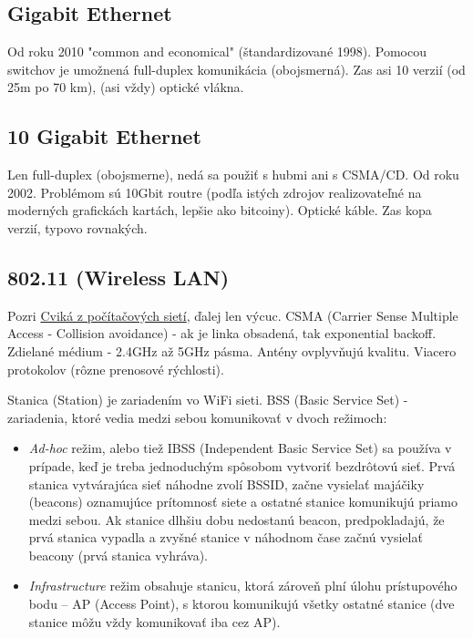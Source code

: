 \documentclass[10pt,a4paper]{article}
\begin{document}
\subsection{Gigabit Ethernet}       
Od roku 2010 "common and economical" (štandardizované 1998). Pomocou switchov je umožnená full-duplex komunikácia (obojsmerná). 
Zas asi 10 verzií (od 25m po 70 km), (asi vždy) optické vlákna. 

\subsection{10 Gigabit Ethernet}  
Len full-duplex (obojsmerne), nedá sa použiť s hubmi ani s CSMA/CD. 
Od roku 2002. Problémom sú 10Gbit routre (podľa istých zdrojov realizovateľné na moderných grafickách kartách, lepšie ako bitcoiny). Optické káble. Zas kopa verzií, typovo rovnakých. 

\subsection{802.11 (Wireless LAN)}  

Pozri \href{http://netlab.dcs.fmph.uniba.sk/siete/cviko2/}{Cviká z počítačových sietí}, ďalej len výcuc. 
CSMA (Carrier Sense Multiple Access - Collision avoidance) - ak je linka obsadená, tak exponential backoff. Zdielané médium - 2.4GHz až 5GHz pásma. 
Antény ovplyvňujú kvalitu. Viacero protokolov (rôzne prenosové rýchlosti).

Stanica (Station) je zariadením vo WiFi sieti. BSS (Basic Service Set) - zariadenia, ktoré vedia medzi sebou komunikovať v dvoch režimoch:
\begin{itemize}
\item \emph{Ad-hoc} režim, alebo tiež IBSS (Independent Basic Service Set) sa používa v prípade, keď je treba jednoduchým spôsobom vytvoriť bezdrôtovú sieť. Prvá stanica vytvárajúca sieť náhodne zvolí BSSID, začne vysielať majáčiky (beacons) oznamujúce prítomnosť siete a ostatné stanice komunikujú priamo medzi sebou. Ak stanice dlhšiu dobu nedostanú beacon, predpokladajú, že prvá stanica vypadla a zvyšné stanice v náhodnom čase začnú vysielať beacony (prvá stanica vyhráva).
\item \emph{Infrastructure} režim obsahuje stanicu, ktorá zároveň plní úlohu prístupového bodu -- AP (Access Point), s ktorou komunikujú všetky ostatné stanice (dve stanice môžu vždy komunikovať iba cez AP).
\end{itemize}
     
\end{document}
